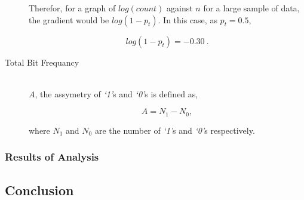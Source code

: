 \begin{description}
					Therefor, for a graph of $log(count)$ against $n$ for a large sample of data, the gradient would be $log(1 - p_t)$.
					In this case, as $p_t = 0.5$, 

					\begin{equation}
						log(1 - p_t) = -0.30\ .
						\label{eqn:log_chain_length_gradient}			
					\end{equation}

				\item[Total Bit Frequancy] \hfill \\
					
					$A$, the assymetry of \textit{`1'}s and \textit{`0'}s is defined as,

					\begin{equation}
						A = N_1 - N_0,
						\label{eqn:a_def}
					\end{equation}

					where $N_1$ and $N_0$ are the number of \textit{`1'}s and \textit{`0'}s respectively.



			\end{description}	

		\subsubsection{Results of Analysis}

	\subsection{Conclusion}